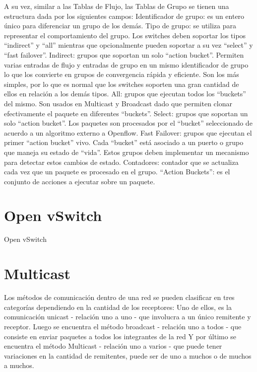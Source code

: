 \documentclass[12pt,a4paper,oneside]{book}
\begin{document}
	A su vez, similar a las Tablas de Flujo, las Tablas de Grupo se tienen una estructura dada por los siguientes campos:
Identificador de grupo: es un entero único para diferenciar un grupo de los demás.
Tipo de grupo: se utiliza para representar el comportamiento del grupo. Los switches deben soportar los tipos “indirect” y “all” mientras que opcionalmente pueden soportar a su vez “select” y “fast failover”.
Indirect: grupos que soportan un solo “action bucket”. Permiten varias entradas de flujo y entradas de grupo en un mismo identificador de grupo lo que los convierte en grupos de convergencia rápida y  eficiente. Son los más simples, por lo que es normal que los switches soporten una gran cantidad de ellos en relación a los demás tipos.
All: grupos que ejecutan todos los “buckets” del mismo. Son usados en Multicast y Broadcast dado que permiten clonar efectivamente el paquete en diferentes “buckets”.
Select: grupos que soportan un solo “action bucket”. Los paquetes son procesados por el “bucket” seleccionado de acuerdo a un algoritmo externo a Openflow.
Fast Failover: grupos que ejecutan el primer “action bucket” vivo. Cada “bucket” está asociado a un puerto o grupo que maneja su estado de “vida”. Estos grupos deben implementar un mecanismo para detectar estos cambios de estado.
Contadores: contador que se actualiza cada vez que un paquete es procesado en el grupo.
“Action Buckets”: es el conjunto de acciones a ejecutar sobre un paquete.


\section{Open vSwitch}

Open vSwitch

\section{Multicast}
\label{marco_multicast}

Los métodos de comunicación dentro de una red se pueden clasificar en tres categorías dependiendo en la cantidad de los receptores:
Uno de ellos, es  la comunicación unicast - relación uno a uno - que involucra a un único remitente y receptor. 
Luego se encuentra el método broadcast - relación uno a todos - que consiste en enviar paquetes a todos los integrantes de la red 
Y por último se encuentra el  método Multicast - relación uno a varios - que puede tener variaciones en la cantidad de remitentes, puede ser de uno a muchos o de muchos a muchos.
\end{document}
